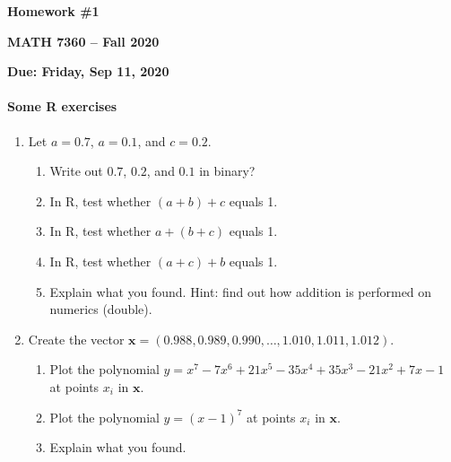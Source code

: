 \documentclass[12pt]{report}
\newcommand{\Vec}[1]{\bm{#1}}
\begin{document}
\centerline{ {\Large
\textbf{Homework \#1}
}}
\centerline{ {\Large 
\textbf{MATH 7360 -- Fall 2020}
}}
\centerline{ {
\textbf{Due: Friday, Sep 11, 2020}
}}

\paragraph{Some R exercises}

\begin{enumerate}
\item Let $a = 0.7$, $a = 0.1$,  and $c = 0.2$. 
     \begin{enumerate}[label=(\alph*)]
     	\item Write out $0.7$, $0.2$, and $0.1$ in binary?
    	\item In R, test whether $(a + b) + c$ equals 1.
	\item In R, test whether $a + (b + c)$ equals 1.
	\item In R, test whether $(a + c) + b$ equals 1.
	\item Explain what you found.  Hint: find out how addition is performed on numerics (double).
     \end{enumerate}

\item Create the vector $\Vec{x} = (0.988, 0.989, 0.990, \dots, 1.010, 1.011, 1.012)$.
    \begin{enumerate}[label=(\alph*)]
	\item Plot the polynomial $y = x^7 - 7 x^6 + 21 x^5 - 35x^4 + 35x^3 - 21 x^2 + 7x -1$ at points $x_i$ in $\Vec{x}$.
	\item Plot the polynomial $y = (x - 1)^7$ at points $x_i$ in $\Vec{x}$.
	\item Explain what you found.
    \end{enumerate}


\end{enumerate}
\end{document}
